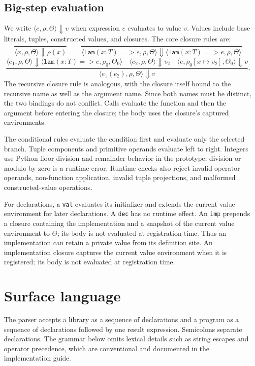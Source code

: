 \documentclass[11pt]{article}
\begin{document}
\subsection{Big-step evaluation}

We write \(\langle e,\rho,\Theta\rangle\Downarrow v\) when expression
\(e\) evaluates to value \(v\). Values include base literals, tuples,
constructed values, and closures. The core closure rules are:
\[
\frac{}{\langle x,\rho,\Theta\rangle\Downarrow\rho(x)}
\qquad
\frac{}{\langle\texttt{lam}(x:T)=>e,\rho,\Theta\rangle
  \Downarrow \langle\texttt{lam}(x:T)=>e,\rho,\Theta\rangle}
\]
\[
\frac{\langle e_1,\rho,\Theta\rangle\Downarrow
          \langle\texttt{lam}(x:T)=>e,\rho_0,\Theta_0\rangle
      \quad \langle e_2,\rho,\Theta\rangle\Downarrow v_2
      \quad \langle e,\rho_0[x\mapsto v_2],\Theta_0\rangle\Downarrow v}
     {\langle e_1(e_2),\rho,\Theta\rangle\Downarrow v}.
\]
The recursive closure rule is analogous, with the closure itself bound to
the recursive name as well as the argument name. Since both names must be
distinct, the two bindings do not conflict. Calls evaluate the function and
then the argument before entering the closure; the body uses the closure's
captured environments.

The conditional rules evaluate the condition first and evaluate only the
selected branch. Tuple components and primitive operands evaluate left to
right. Integers use Python floor division and remainder behavior in the
prototype; division or modulo by zero is a runtime error. Runtime checks also
reject invalid operator operands, non-function application, invalid tuple
projections, and malformed constructed-value operations.

For declarations, a \texttt{val} evaluates its initializer and extends the
current value environment for later declarations. A \texttt{dec} has no
runtime effect. An \texttt{imp} prepends a closure containing the
implementation and a snapshot of the current value environment to
\(\Theta\); its body is not evaluated at registration time. Thus an
implementation can retain a private value from its definition site.
An implementation closure captures the current value environment when it is
registered; its body is not evaluated at registration time.

\section{Surface language}

The parser accepts a library as a sequence of declarations and a program as a
sequence of declarations followed by one result expression. Semicolons
separate declarations. The grammar below omits lexical details such as string
escapes and operator precedence, which are conventional and documented in
the implementation guide.
\end{document}
